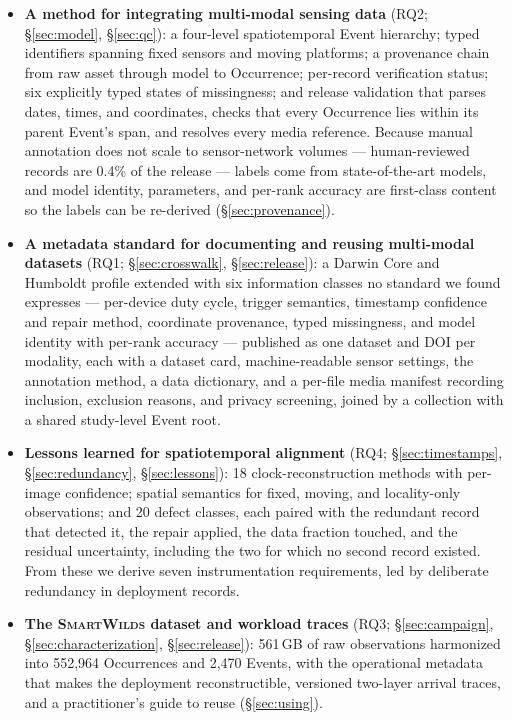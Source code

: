 \documentclass[sigconf]{acmart}
\newcommand{\smartwilds}{\textsc{SmartWilds}\xspace}
\begin{document}
\begin{itemize}
    \item \textbf{A method for integrating multi-modal sensing data}
    (RQ2; \S\ref{sec:model}, \S\ref{sec:qc}): a four-level
    spatiotemporal Event hierarchy; typed identifiers spanning fixed
    sensors and moving platforms; a provenance chain from raw asset
    through model to Occurrence; per-record verification status; six
    explicitly typed states of missingness; and release validation that
    parses dates, times, and coordinates, checks that every Occurrence
    lies within its parent Event's span, and resolves every media
    reference. Because manual annotation does not scale to
    sensor-network volumes --- human-reviewed records are 0.4\% of the
    release --- labels come from state-of-the-art models, and model
    identity, parameters, and per-rank accuracy are first-class content
    so the labels can be re-derived (\S\ref{sec:provenance}).

    \item \textbf{A metadata standard for documenting and reusing
    multi-modal datasets} (RQ1; \S\ref{sec:crosswalk},
    \S\ref{sec:release}): a Darwin Core and Humboldt profile extended
    with six information classes no standard we found expresses ---
    per-device duty cycle, trigger semantics, timestamp confidence and
    repair method, coordinate provenance, typed missingness, and model
    identity with per-rank accuracy --- published as one dataset and DOI
    per modality, each with a dataset card, machine-readable sensor
    settings, the annotation method, a data dictionary, and a per-file
    media manifest recording inclusion, exclusion reasons, and privacy
    screening, joined by a collection with a shared study-level Event
    root.

    \item \textbf{Lessons learned for spatiotemporal alignment}
    (RQ4; \S\ref{sec:timestamps}, \S\ref{sec:redundancy},
    \S\ref{sec:lessons}): 18 clock-reconstruction methods with
    per-image confidence; spatial semantics for fixed, moving, and
    locality-only observations; and 20 defect classes, each paired with
    the redundant record that detected it, the repair applied, the data
    fraction touched, and the residual uncertainty, including the two
    for which no second record existed. From these we derive seven
    instrumentation requirements, led by deliberate redundancy in
    deployment records.

    \item \textbf{The \smartwilds dataset and workload traces}
    (RQ3; \S\ref{sec:campaign}, \S\ref{sec:characterization},
    \S\ref{sec:release}): 561\,GB of raw observations harmonized into
    552{,}964 Occurrences and 2{,}470 Events, with the operational
    metadata that makes the deployment reconstructible, versioned
    two-layer arrival traces, and a practitioner's guide to reuse
    (\S\ref{sec:using}).
\end{itemize}
\end{document}
